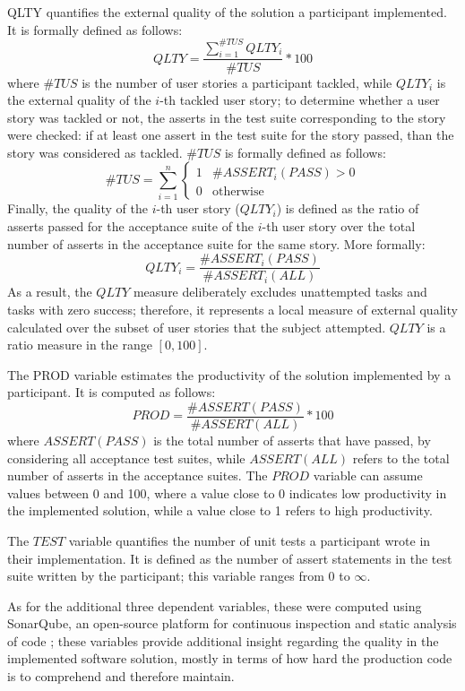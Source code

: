 QLTY quantifies the external quality of the solution a participant implemented. It is formally defined as follows: 
\[
    QLTY = \frac{\sum_{i=1}^{\#TUS} QLTY_i}{\#TUS} * 100 
\]
where $\#TUS$ is the number of user stories a participant tackled, while $QLTY_i$ is the external quality of the $i$-th tackled user story; to determine whether a user story was tackled or not, the asserts in the test suite corresponding to the story were checked: if at least one assert in the test suite for the story passed, than the story was considered as tackled. $\#TUS$ is formally defined as follows:
\[
    \#TUS = \sum_{i=1}^{n} 
        \begin{cases}
            1 & \text{$\#ASSERT_i(PASS) > 0$}\\
                0 & \text{otherwise}
        \end{cases}
\]
Finally, the quality of the $i$-th user story (\ie $QLTY_i$) is defined as the ratio of asserts passed for the acceptance suite of the $i$-th user story over the total number of asserts in the acceptance suite for the same story. More formally:
\[
    QLTY_i = \frac{\#ASSERT_i(PASS)}{\#ASSERT_i(ALL)}
\]
As a result, the $QLTY$ measure deliberately excludes unattempted tasks and tasks with zero success; therefore, it represents a local measure of external quality calculated over the subset of user stories that the subject attempted. $QLTY$ is a ratio measure in the range $[0, 100]$.

The PROD variable estimates the productivity of the solution implemented by a participant. It is computed as follows:
\[
    PROD = \frac{\#ASSERT(PASS)}{\#ASSERT(ALL)} * 100
\]
where $ASSERT(PASS)$ is the total number of asserts that have passed, by considering all acceptance test suites, while $ASSERT(ALL)$ refers to the total number of asserts in the acceptance suites. The $PROD$ variable can assume values between 0 and 100, where a value close to 0 indicates low productivity in the implemented solution, while a value close to 1 refers to high productivity.

The $TEST$ variable quantifies the number of unit tests a participant wrote in their implementation. It is defined as the number of assert statements in the test suite written by the participant; this variable ranges from 0 to $\infty$.

As for the additional three dependent variables, these were computed using SonarQube, an open-source platform for continuous inspection and static analysis of code \cite{SonarQube}; these variables provide additional insight regarding the quality in the implemented software solution, mostly in terms of how hard the production code is to comprehend and therefore maintain. 

